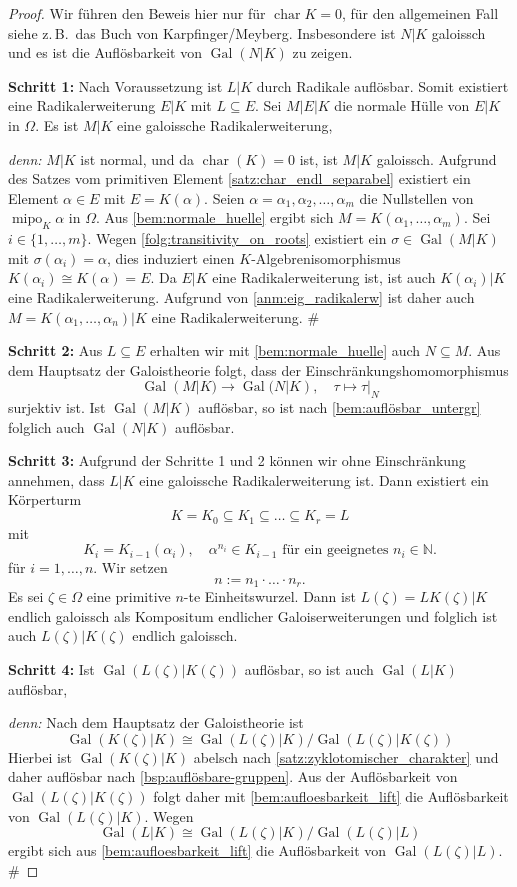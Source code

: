 \documentclass[a4paper, twoside, 11pt, ngerman]{report}
\newcommand{\NN}{\mathds N}
\DeclareMathOperator{\charact}{char}
\DeclareMathOperator{\Gal}{Gal}
\DeclareMathOperator{\mipo}{mipo}
\theoremstyle{definistyle}
\theoremstyle{remark}
\newenvironment{denn}%
  {\par\textit{denn:}}%
  {\hfill\#\par}
\begin{document}
\begin{proof}
Wir führen den Beweis hier nur für $\charact K = 0$, für den allgemeinen Fall siehe z.\,B.\ das Buch von Karpfinger/Meyberg. Insbesondere ist $N|K$ galoissch und es ist die Auflösbarkeit von $\Gal(N|K)$ zu zeigen.

\textbf{Schritt 1:} Nach Voraussetzung ist $L|K$ durch Radikale auflösbar. Somit existiert eine Radikalerweiterung $E|K$ mit $L \subseteq E$. Sei $M|E|K$ die normale Hülle von $E|K$ in $\Omega$. Es ist $M|K$ eine galoissche Radikalerweiterung,
\begin{denn}
$M|K$ ist normal, und da $\charact(K)=0$ ist, ist $M|K$ galoissch.
Aufgrund des Satzes vom primitiven Element \ref{satz:char_endl_separabel} existiert ein Element $\alpha \in E$ mit $E = K(\alpha)$. Seien $\alpha = \alpha_1, \alpha_2, \ldots, \alpha_m$ die Nullstellen von $\mipo_K \alpha$ in $\Omega$. Aus \ref{bem:normale_huelle}
ergibt sich $M = K(\alpha_1, \ldots, \alpha_m)$. Sei $i\in\{1,\ldots,m\}$. Wegen \ref{folg:transitivity_on_roots} existiert ein $\sigma \in \Gal(M|K)$ mit $\sigma(\alpha_i) = \alpha$, dies induziert einen $K$-Algebrenisomorphismus $K(\alpha_i) \cong K(\alpha) = E$.
Da $E|K$ eine Radikalerweiterung ist, ist auch $K(\alpha_i)|K$ eine Radikalerweiterung. Aufgrund von \ref{anm:eig_radikalerw} ist daher auch $M = K(\alpha_1, \ldots, \alpha_n)|K$ eine Radikalerweiterung.
\end{denn}
\textbf{Schritt 2:} Aus $L \subseteq E$ erhalten wir mit \ref{bem:normale_huelle} auch $N \subseteq M$.
Aus dem Hauptsatz der Galoistheorie folgt, dass der Einschränkungshomomorphismus
\[
\Gal(M|K) \to \Gal(N|K), \quad \tau \mapsto \tau|_N
\]
surjektiv ist. Ist $\Gal(M|K)$ auflösbar, so ist nach \ref{bem:auflösbar_untergr} folglich auch $\Gal(N|K)$ auflösbar.

\textbf{Schritt 3:} Aufgrund der Schritte 1 und 2 können wir ohne Einschränkung annehmen, dass $L|K$ eine galoissche Radikalerweiterung ist.
Dann existiert ein Körperturm
\[
K = K_0 \subseteq K_1 \subseteq \ldots \subseteq K_r = L 
\]
mit
\[
K_i = K_{i-1}(\alpha_i), \quad \alpha^{n_i}\in K_{i-1} \text{ für ein geeignetes } n_i\in\NN.
\]
für $i=1,\ldots,n$.
Wir setzen \[
n := n_1 \cdot \ldots \cdot n_r.
\]
Es sei $\zeta \in \Omega$ eine primitive $n$-te Einheitswurzel. Dann ist $L(\zeta) = L K(\zeta)|K$ endlich galoissch als Kompositum endlicher Galoiserweiterungen und folglich ist auch $L(\zeta)|K(\zeta)$ endlich galoissch. 

\textbf{Schritt 4:} Ist $\Gal(L(\zeta)|K(\zeta))$ auflösbar, so ist auch $\Gal(L|K)$ auflösbar,
\begin{denn}
Nach dem Hauptsatz der Galoistheorie ist
\[
\Gal(K(\zeta)|K) \cong \Gal(L(\zeta)|K) / \Gal(L(\zeta)|K(\zeta))
\]
Hierbei ist $\Gal(K(\zeta)|K)$ abelsch nach \ref{satz:zyklotomischer_charakter} und daher auflösbar nach \ref{bsp:auflösbare-gruppen}. Aus der Auflösbarkeit von $\Gal(L(\zeta)|K(\zeta))$ folgt daher mit \ref{bem:aufloesbarkeit_lift} die Auflösbarkeit von $\Gal(L(\zeta)|K)$. Wegen
\[
\Gal(L|K) \cong \Gal(L(\zeta)|K) / \Gal(L(\zeta)|L)
\]
ergibt sich aus \ref{bem:aufloesbarkeit_lift} die Auflösbarkeit von $\Gal(L(\zeta)|L)$.
\end{denn}


\end{proof}
\end{document}
